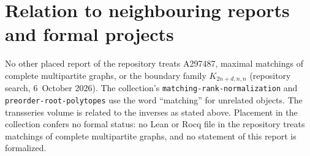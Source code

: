 \documentclass[11pt,letterpaper]{article}
\newcommand{\parthead}{Contents}
\theoremstyle{remark}\newtheorem{remark}[theorem]{Remark}
\newcommand{\file}[1]{\nolinkurl{#1}}
\begin{document}
\section*{Relation to neighbouring reports and formal projects}\label{tmm:sec:neighbours}
No other placed report of the repository treats A297487, maximal matchings of complete multipartite graphs, or the boundary family $K_{2n+d,n,n}$ (repository search, 6~October 2026). The collection's \file{matching-rank-normalization} and \file{preorder-root-polytopes} use the word ``matching'' for unrelated objects. The transseries volume \cite{TSvol} is related to the inverses as stated above. Placement in the collection confers no formal status: no Lean or Rocq file in the repository treats matchings of complete multipartite graphs, and no statement of this report is formalized.
\clearpage
\renewcommand{\parthead}{Part I (Report 176)}
\end{document}
